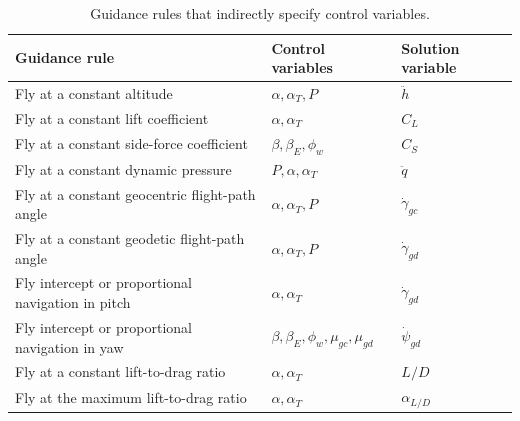 \begin{table}[htbp]
  \centering
  \caption{Guidance rules that indirectly specify control variables.}
  \label{tab:indirect-guidance-rules}
  \small
  \renewcommand{\arraystretch}{1.08}
  \begin{tabularx}{\linewidth}{@{}>{\raggedright\arraybackslash}X>{\raggedright\arraybackslash}p{}>{\centering\arraybackslash}p{}@{}}
    \toprule
    Guidance rule & Control variables & Solution variable\\
    \midrule
    Fly at a constant altitude & $\alpha,\alpha_T,P$ & $\ddot h$\\
    Fly at a constant lift coefficient & $\alpha,\alpha_T$ & $C_L$\\
    Fly at a constant side-force coefficient & $\beta,\beta_E,\phi_w$ & $C_S$\\
    Fly at a constant dynamic pressure & $P,\alpha,\alpha_T$ & $\ddot q$\\
    Fly at a constant geocentric flight-path angle & $\alpha,\alpha_T,P$ & $\dot\gamma_{gc}$\\
    Fly at a constant geodetic flight-path angle & $\alpha,\alpha_T,P$ & $\dot\gamma_{gd}$\\
    Fly intercept or proportional navigation in pitch & $\alpha,\alpha_T$ & $\dot\gamma_{gd}$\\
    Fly intercept or proportional navigation in yaw & $\beta,\beta_E,\phi_w,\mu_{gc},\mu_{gd}$ & $\dot\psi_{gd}$\\
    Fly at a constant lift-to-drag ratio & $\alpha,\alpha_T$ & $L/D$\\
    Fly at the maximum lift-to-drag ratio & $\alpha,\alpha_T$ & $\alpha_{L/D}$\\
    \bottomrule
  \end{tabularx}
\end{table}

